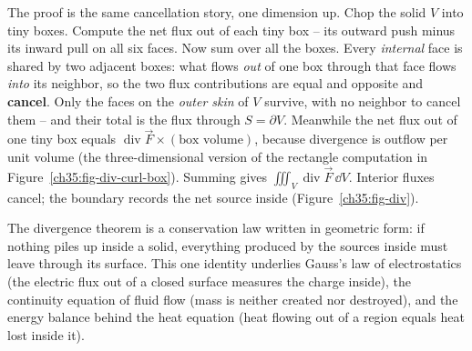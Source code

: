 \begin{happeningbox}
The proof is the same cancellation story, one dimension up. Chop the solid $V$ into
tiny boxes. Compute the net flux out of each tiny box -- its outward push minus its
inward pull on all six faces. Now sum over all the boxes. Every \emph{internal}
face is shared by two adjacent boxes: what flows \emph{out} of one box through that
face flows \emph{into} its neighbor, so the two flux contributions are equal and
opposite and \textbf{cancel}. Only the faces on the \emph{outer skin} of $V$
survive, with no neighbor to cancel them -- and their total is the flux through
$S=\partial V$. Meanwhile the net flux out of one tiny box equals
$\operatorname{div}\vec F\times(\text{box volume})$, because divergence is
outflow per unit volume (the three-dimensional version of the rectangle computation
in Figure~\ref{ch35:fig-div-curl-box}). Summing gives
$\iiint_V \operatorname{div}\vec F\,\dd V$. Interior fluxes cancel; the boundary
records the net source inside (Figure~\ref{ch35:fig-div}).
\end{happeningbox}

\begin{aestheticbox}
The divergence theorem is a conservation law written in geometric form: if nothing
piles up inside a solid, everything produced by the sources inside must leave
through its surface. This one identity underlies Gauss's law of electrostatics (the
electric flux out of a closed surface measures the charge inside), the continuity
equation of fluid flow (mass is neither created nor destroyed), and the energy
balance behind the heat equation (heat flowing out of a region equals heat lost
inside it).
\end{aestheticbox}

